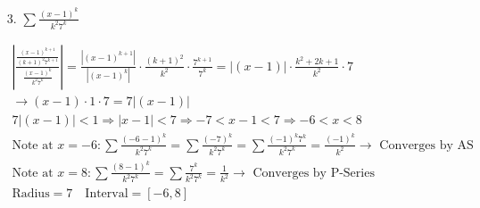 \begin{itemize}
        \item [3.] $\sum\frac{(x-1)^{k}}{k^{2}7^{k}}$
        \\
        \begin{mdframed}
            \begin{equation*}
                \begin{gathered}
                    \left|\frac{\frac{(x-1)^{k+1}}{(k+1)^{2}7^{k+1}}}
                            {\frac{(x-1)^{k}}{k^{2}7^{k}}}\right| =
                            \frac{|(x-1)^{k+1}|}{|(x-1)^{k}|}\cdot
                            \frac{(k+1)^{2}}{k^{2}}\cdot
                            \frac{7^{k+1}}{7^{k}} =
                            |(x-1)|\cdot\frac{k^{2}+2k+1}{k^{2}}\cdot 7     \\
                            \rightarrow (x-1) \cdot 1 \cdot 7 = 7|(x-1)|    \\
                            7|(x-1)| < 1 \Rightarrow |x-1| < 7 \Rightarrow
                            -7 < x - 1 < 7 \Rightarrow -6 < x < 8           \\
                            \text{Note at } x = -6: \sum\frac{(-6-1)^{k}}{k^{2}7^{k}} =
                            \sum\frac{(-7)^{k}}{k^{2}7^{k}} = 
                            \sum\frac{(-1)^{k}7^{k}}{k^{2}7^{k}} =
                            \frac{(-1)^{k}}{k^{2}} \rightarrow \text{ Converges by AS}  \\
                            \text{Note at } x = 8: \sum\frac{(8-1)^{k}}{k^{2}7^{k}} =
                            \sum\frac{7^{k}}{k^{2}7^{k}} = 
                            \frac{1}{k^{2}} \rightarrow \text{ Converges by P-Series}   \\
                            \text{Radius} = 7 \quad \text{Interval} = \left[-6,8\right]
                \end{gathered}
            \end{equation*}
        \end{mdframed}


\end{itemize}
